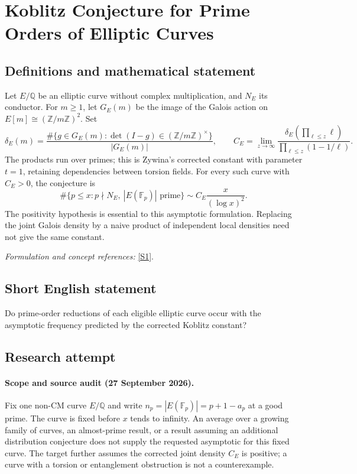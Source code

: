 \documentclass[11pt]{article}
\begin{document}
\section*{\texorpdfstring{Koblitz Conjecture for Prime Orders of Elliptic Curves}{Koblitz Conjecture for Prime Orders of Elliptic Curves}}\label{486}
\subsection{Definitions and mathematical statement}
Let $E/{\mathbb{Q}}$ be an elliptic curve without complex multiplication, and $N_E$ its conductor. For $m\ge1$, let $G_E(m)$ be the image of the Galois action on $E[m]\cong({\mathbb{Z}}/m{\mathbb{Z}})^2$. Set
\[
 \delta_E(m)=\frac{\#\{g\in G_E(m):\det(I-g)\in({\mathbb{Z}}/m{\mathbb{Z}})^\times\}}
 {|G_E(m)|},
 \qquad
 C_E=\lim_{z\to\infty}
 \frac{\delta_E(\prod_{\ell\le z}\ell)}{\prod_{\ell\le z}(1-1/\ell)}.
\]
The products run over primes; this is Zywina's corrected constant with parameter $t=1$, retaining dependencies between torsion fields. For every such curve with $C_E>0$, the conjecture is
\[
 \#\{p\le x:p\nmid N_E,\ |E({\mathbb{F}}_p)|\text{ prime}\}
       \sim C_E\frac{x}{(\log x)^2}.
\]
The positivity hypothesis is essential to this asymptotic formulation. Replacing the joint Galois density by a naive product of independent local densities need not give the same constant.
\par\smallskip\textit{Formulation and concept references:} \href{https://arxiv.org/abs/0909.5280}{[S1]}.

\subsection{Short English statement}
Do prime-order reductions of each eligible elliptic curve occur with the asymptotic frequency predicted by the corrected Koblitz constant?
\subsection{Research attempt}

\paragraph{Scope and source audit (27 September 2026).}
Fix one non-CM curve $E/\mathbb Q$ and write
$n_p=|E(\mathbb F_p)|=p+1-a_p$ at a good prime. The curve is fixed before
$x$ tends to infinity. An average over a growing family of curves, an
almost-prime result, or a result assuming an additional distribution
conjecture does not supply the requested asymptotic for this fixed curve.
The target further assumes the corrected joint density $C_E$ is positive;
a curve with a torsion or entanglement obstruction is not a counterexample.
\end{document}
